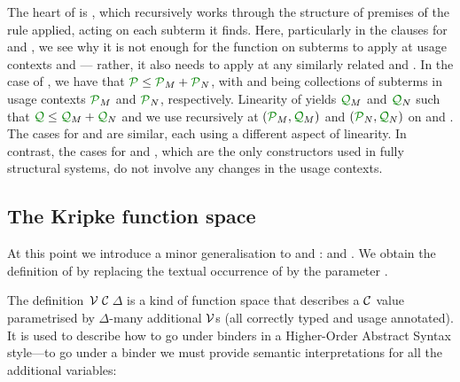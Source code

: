 The heart of  is , which recursively
works through the structure  of premises of the rule applied,
acting on each subterm it finds.
Here, particularly in the clauses for  and
, we see why it is not enough for the
function on subterms to apply at usage contexts  and 
--- rather, it also needs to apply at any similarly related 
and .
In the case of , we have that
$\grP \leq \grP_M + \grP_N$, with  and  being
collections of subterms in usage contexts $\grP_M$ and $\grP_N$, respectively.
Linearity of  yields $\grQ_M$ and $\grQ_N$ such that
$\grQ \leq \grQ_M + \grQ_N$ and we use  recursively at
$(\grP_M, \grQ_M)$ and $(\grP_N, \grQ_N)$ on  and .
The cases for  and
 are similar, each using a different aspect
of linearity.
In contrast, the cases for  and
, which are the only constructors used in fully structural
systems, do not involve any changes in the usage contexts.


\subsection{The Kripke function space}\label{sec:kripke}

At this point we introduce a minor generalisation to
 and :
\AgdaSpace{} and
\AgdaSpace{}.  We obtain the
definition of \AgdaSpace{} by
replacing the textual occurrence of  by the parameter
.

The definition \,$\mathcal V$\,$\mathcal C$\,$\Delta$ is a kind
of function space that describes a $\mathcal C$ value parametrised by
$\Delta$-many additional $\mathcal V$s (all correctly typed and usage
annotated). It is used to describe how to go under binders in a
Higher-Order Abstract Syntax style---to go under a binder we must
provide semantic interpretations for all the additional variables:


